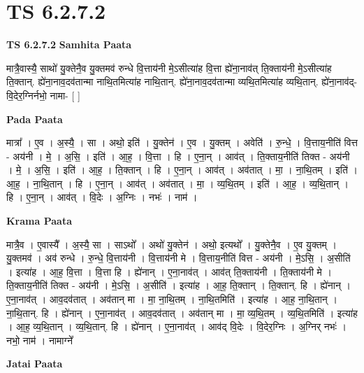 \documentclass[17pt]{extarticle}
\begin{document}
\section{ TS 6.2.7.2 }

\textbf{TS 6.2.7.2 } \newline
\textbf{Samhita Paata} \newline

मात्रै॒वास्यै॒ साथो॑ यु॒क्तेनै॒व यु॒क्तमव॑ रुन्धे वि॒त्ताय॑नी मे॒ऽसीत्या॑ह वि॒त्ता ह्ये॑ना॒नाव॑त् ति॒क्ताय॑नी मे॒ऽसीत्या॑ह ति॒क्तान्. ह्ये॑ना॒नाव॒दव॑तान्मा नाथि॒तमित्या॑ह नाथि॒तान्. ह्ये॑ना॒नाव॒दव॑तान्मा व्यथि॒तमित्या॑ह व्यथि॒तान्. ह्ये॑ना॒नाव॑द्-वि॒देर॒ग्निर्नभो॒ नामा- [  ] \newline

\textbf{Pada Paata} \newline

मात्रा᳚ । ए॒व । अ॒स्यै॒ । सा । अथो॒ इति॑ । यु॒क्तेन॑ । ए॒व । यु॒क्तम् । अवेति॑ । रु॒न्धे॒ । वि॒त्ताय॒नीति॑ वित्त - अय॑नी । मे॒ । अ॒सि॒ । इति॑ । आ॒ह॒ । वि॒त्ता । हि । ए॒ना॒न् । आव॑त् । ति॒क्ताय॒नीति॑ तिक्त - अय॑नी । मे॒ । अ॒सि॒ । इति॑ । आ॒ह॒ । ति॒क्तान् । हि । ए॒ना॒न् । आव॑त् । अव॑तात् । मा॒ । ना॒थि॒तम् । इति॑ । आ॒ह॒ । ना॒थि॒तान् । हि । ए॒ना॒न् । आव॑त् । अव॑तात् । मा॒ । व्य॒थि॒तम् । इति॑ । आ॒ह॒ । व्य॒थि॒तान् । हि । ए॒ना॒न् । आव॑त् । वि॒देः । अ॒ग्निः । नभः॑ । नाम॑ ।  \newline


\textbf{Krama Paata} \newline

मात्रै॒व । ए॒वास्यै᳚ । अ॒स्यै॒ सा । साऽथो᳚ । अथो॑ यु॒क्तेन॑ । अथो॒ इत्यथो᳚ । यु॒क्तेनै॒व । ए॒व यु॒क्तम् । यु॒क्तमव॑ । अव॑ रुन्धे । रु॒न्धे॒ वि॒त्ताय॑नी । वि॒त्ताय॑नी मे । वि॒त्ताय॒नीति॑ वित्त - अय॑नी । मे॒ऽसि॒ । अ॒सीति॑ । इत्या॑ह । आ॒ह॒ वि॒त्ता । वि॒त्ता हि । ह्ये॑नान् । ए॒ना॒नाव॑त् । आव॑त् ति॒क्ताय॑नी । ति॒क्ताय॑नी मे । ति॒क्ताय॒नीति॑ तिक्त - अय॑नी । मे॒ऽसि॒ । अ॒सीति॑ । इत्या॑ह । आ॒ह॒ ति॒क्तान् । ति॒क्तान्. हि । ह्ये॑नान् । ए॒ना॒नाव॑त् । आव॒दव॑तात् । अव॑तान् मा । मा॒ ना॒थि॒तम् । ना॒थि॒तमिति॑ । इत्या॑ह । आ॒ह॒ ना॒थि॒तान् । ना॒थि॒तान्. हि । ह्ये॑नान् । ए॒ना॒नाव॑त् । आव॒दव॑तात् । अव॑तान् मा । मा॒ व्य॒थि॒तम् । व्य॒थि॒तमिति॑ । इत्या॑ह । आ॒ह॒ व्य॒थि॒तान् । व्य॒थि॒तान्. हि । ह्ये॑नान् । ए॒ना॒नाव॑त् । आव॑द् वि॒देः । वि॒देर॒ग्निः । 
अ॒ग्निर् नभः॑ । नभो॒ नाम॑ । नामाग्ने᳚ \newline

\textbf{Jatai Paata} \newline
\end{document}
